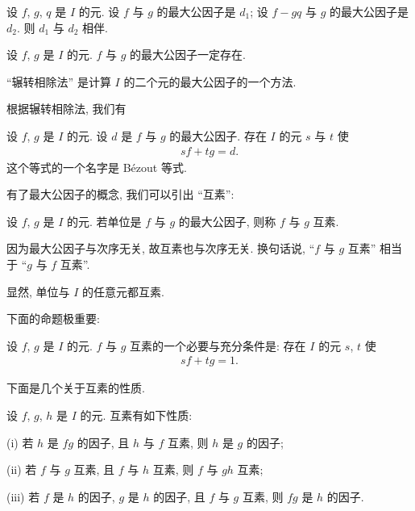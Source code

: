 \begin{proposition}
    设 $f$, $g$, $q$ 是 $I$ 的元. 设 $f$ 与 $g$ 的最大公因子是 $d_1$; 设 $f - gq$ 与 $g$ 的最大公因子是 $d_2$. 则 $d_1$ 与 $d_2$ 相伴.
\end{proposition}

\begin{proposition}
    设 $f$, $g$ 是 $I$ 的元. $f$ 与 $g$ 的最大公因子一定存在.
\end{proposition}

\begin{proposition}
    ``辗转相除法'' 是计算 $I$ 的二个元的最大公因子的一个方法.
\end{proposition}

根据辗转相除法, 我们有
\begin{proposition}
    设 $f$, $g$ 是 $I$ 的元. 设 $d$ 是 $f$ 与 $g$ 的最大公因子. 存在 $I$ 的元 $s$ 与 $t$ 使
    \begin{align*}
        sf + tg = d.
    \end{align*}
    这个等式的一个名字是 Bézout 等式.
\end{proposition}

有了最大公因子的概念, 我们可以引出 ``互素'':
\begin{definition}
    设 $f$, $g$ 是 $I$ 的元. 若单位是 $f$ 与 $g$ 的最大公因子, 则称 $f$ 与 $g$ 互素.
\end{definition}

\begin{remark}
    因为最大公因子与次序无关, 故互素也与次序无关. 换句话说, ``$f$ 与 $g$ 互素'' 相当于 ``$g$ 与 $f$ 互素''.
\end{remark}

\begin{proposition}
    显然, 单位与 $I$ 的任意元都互素.
\end{proposition}

下面的命题极重要:
\begin{proposition}
    设 $f$, $g$ 是 $I$ 的元. $f$ 与 $g$ 互素的一个必要与充分条件是: 存在 $I$ 的元 $s$, $t$ 使
    \begin{align*}
        sf + tg = 1.
    \end{align*}
\end{proposition}

下面是几个关于互素的性质.

\begin{proposition}
    设 $f$, $g$, $h$ 是 $I$ 的元. 互素有如下性质:

    (i) 若 $h$ 是 $fg$ 的因子, 且 $h$ 与 $f$ 互素, 则 $h$ 是 $g$ 的因子;

    (ii) 若 $f$ 与 $g$ 互素, 且 $f$ 与 $h$ 互素, 则 $f$ 与 $gh$ 互素;

    (iii) 若 $f$ 是 $h$ 的因子, $g$ 是 $h$ 的因子, 且 $f$ 与 $g$ 互素, 则 $fg$ 是 $h$ 的因子.
\end{proposition}

